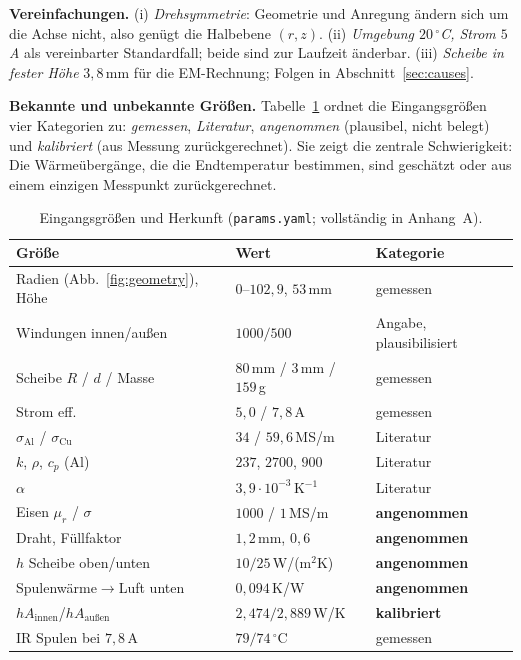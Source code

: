 \documentclass[a4paper, 10pt, conference]{ieeeconf}
\theoremstyle{remark}
\begin{document}
\textbf{Vereinfachungen.} (i) \emph{Drehsymmetrie}: Geometrie und
Anregung ändern sich um die Achse nicht, also genügt die Halbebene $(r,z)$.
(ii) \emph{Umgebung $20\,^\circ$C, Strom $5\,$A} als vereinbarter
Standardfall; beide sind zur Laufzeit änderbar. (iii) \emph{Scheibe in
fester Höhe} $3{,}8\,$mm für die EM-Rechnung; Folgen in
Abschnitt~\ref{sec:causes}.

\textbf{Bekannte und unbekannte Größen.} Tabelle~\ref{tab:inputs} ordnet
die Eingangsgrößen vier Kategorien zu: \emph{gemessen},
\emph{Literatur}, \emph{angenommen} (plausibel, nicht belegt) und
\emph{kalibriert} (aus Messung zurückgerechnet). Sie zeigt die zentrale
Schwierigkeit: Die Wärmeübergänge, die die Endtemperatur bestimmen, sind
geschätzt oder aus einem einzigen Messpunkt zurückgerechnet.

\begin{table}[t]
\centering\footnotesize
\caption{Eingangsgrößen und Herkunft (\texttt{params.yaml}; vollständig in Anhang~A).}
\label{tab:inputs}
\begin{tabularx}{\columnwidth}{@{}X l l@{}}
\toprule
Größe & Wert & Kategorie \\
\midrule
Radien (Abb.~\ref{fig:geometry}), Höhe & $0$--$102{,}9$, $53\,$mm & gemessen \\
Windungen innen/außen & $1000/500$ & Angabe, plausibilisiert \\
Scheibe $R$ / $d$ / Masse & $80\,$mm / $3\,$mm / $159\,$g & gemessen \\
Strom eff. & $5{,}0$ / $7{,}8\,$A & gemessen \\
$\sigma_{\mathrm{Al}}$ / $\sigma_{\mathrm{Cu}}$ & $34$ / $59{,}6\,$MS/m & Literatur \\
$k$, $\rho$, $c_p$ (Al) & $237$, $2700$, $900$ & Literatur \\
$\alpha$ & $3{,}9\cdot10^{-3}\,$K$^{-1}$ & Literatur \\
Eisen $\mu_r$ / $\sigma$ & $1000$ / $1\,$MS/m & \textbf{angenommen} \\
Draht, Füllfaktor & $1{,}2\,$mm, $0{,}6$ & \textbf{angenommen} \\
$h$ Scheibe oben/unten & $10/25\,$W/(m$^2$K) & \textbf{angenommen} \\
Spulenwärme$\to$Luft unten & $0{,}094\,$K/W & \textbf{angenommen} \\
$hA_{\mathrm{innen}}$/$hA_{\mathrm{außen}}$ & $2{,}474/2{,}889\,$W/K & \textbf{kalibriert} \\
IR Spulen bei $7{,}8\,$A & $79/74\,^\circ$C & gemessen \\
\bottomrule
\end{tabularx}
\end{table}
\end{document}
